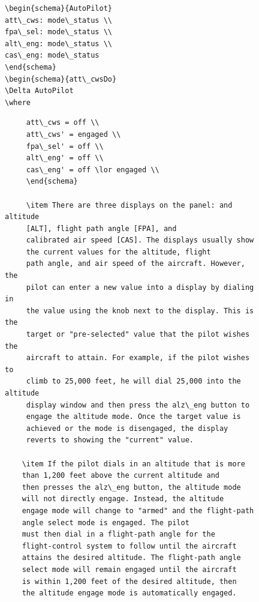 \begin{figure}[H]
\begin{minipage}{0.45\textwidth}
\begin{tiny}
\begin{BVerbatim}
\begin{schema}{AutoPilot}
att\_cws: mode\_status \\
fpa\_sel: mode\_status \\
alt\_eng: mode\_status \\
cas\_eng: mode\_status
\end{schema}
\begin{schema}{att\_cwsDo}
\Delta AutoPilot 
\where
\end{BVerbatim}
     \end{tiny}
     \end{minipage}\hfill
     \begin{minipage}{0.45\textwidth}
     \centering
     \begin{tiny}
     \begin{BVerbatim}
     att\_cws = off \\
     att\_cws' = engaged \\
     fpa\_sel' = off \\
     alt\_eng' = off \\
     cas\_eng' = off \lor engaged \\
     \end{schema}
                       
     \item There are three displays on the panel: and altitude
     [ALT], flight path angle [FPA], and
     calibrated air speed [CAS]. The displays usually show 
     the current values for the altitude, flight
     path angle, and air speed of the aircraft. However, the 
     pilot can enter a new value into a display by dialing in
     the value using the knob next to the display. This is the
     target or "pre-selected" value that the pilot wishes the
     aircraft to attain. For example, if the pilot wishes to
     climb to 25,000 feet, he will dial 25,000 into the altitude
     display window and then press the alz\_eng button to 
     engage the altitude mode. Once the target value is
     achieved or the mode is disengaged, the display
     reverts to showing the "current" value.
                      
    \item If the pilot dials in an altitude that is more 
    than 1,200 feet above the current altitude and
    then presses the alz\_eng button, the altitude mode 
    will not directly engage. Instead, the altitude
    engage mode will change to "armed" and the flight-path
    angle select mode is engaged. The pilot
    must then dial in a flight-path angle for the
    flight-control system to follow until the aircraft
    attains the desired altitude. The flight-path angle 
    select mode will remain engaged until the aircraft 
    is within 1,200 feet of the desired altitude, then 
    the altitude engage mode is automatically engaged.
                     

\end{BVerbatim}
\end{tiny}
\end{minipage}
\end{figure}
